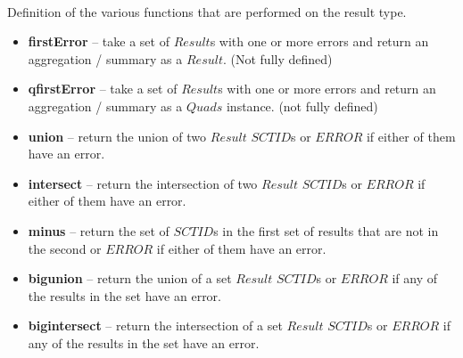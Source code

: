 \documentclass{article}
\begin{document}
\paragraph{}
Definition of the various functions that are performed on the result type. \\
\begin{itemize}[noitemsep,nolistsep]
\item \textbf{firstError} -- take a set of $Result$s with one or more errors and return an aggregation / summary as a $Result$.  (Not fully defined)
\item \textbf{qfirstError} -- take a set of $Result$s with one or more errors and return an aggregation / summary as a $Quads$ instance. (not fully defined)
\end{itemize}

\begin{itemize}[noitemsep]
\item \textbf{union} -- return the union of two $Result$ $SCTID$s or $ERROR$ if either of them have an error.
\item \textbf{intersect} -- return the intersection of two  $Result$ $SCTID$s or $ERROR$ if either of them have an error.
\item \textbf{minus} -- return the set of $SCTID$s in the first set of results that are not in the second or $ERROR$ if either of them have an error.
\item \textbf{bigunion} -- return the union of a set $Result$ $SCTID$s or $ERROR$ if any of the results in the set have an error.
\item \textbf{bigintersect} -- return the intersection of a set $Result$ $SCTID$s or $ERROR$ if any of the results in the set have an error.
\end{itemize}
\end{document}
